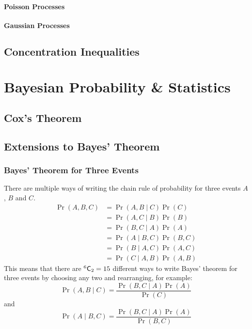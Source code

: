 \documentclass[11pt]{report} %
\begin{document}
\subsubsection{Poisson Processes}

\subsubsection{Gaussian Processes}

\section{Concentration Inequalities}

\chapter{Bayesian Probability \& Statistics}

\section{Cox's Theorem}

\section{Extensions to Bayes' Theorem}

\subsection{Bayes' Theorem for Three Events}

There are multiple ways of writing the chain rule of probability for three events $A$, $B$ and $C$.
\begin{align}
\operatorname{Pr}\left(A, B, C\right) &= \operatorname{Pr}\left(A, B\middle|C\right)\operatorname{Pr}\left(C\right) \\
&= \operatorname{Pr}\left(A, C\middle|B\right)\operatorname{Pr}\left(B\right) \\
&= \operatorname{Pr}\left(B, C\middle|A\right)\operatorname{Pr}\left(A\right) \\
&= \operatorname{Pr}\left(A\middle|B, C\right)\operatorname{Pr}\left(B, C\right) \\
&= \operatorname{Pr}\left(B\middle|A, C\right)\operatorname{Pr}\left(A, C\right) \\
&= \operatorname{Pr}\left(C\middle|A, B\right)\operatorname{Pr}\left(A, B\right)
\end{align}
This means that there are $\mathstrut^{6}\mathsf{C}_{2} = 15$ different ways to write Bayes' theorem for three events by choosing any two and rearranging, for example:
\begin{equation}
\operatorname{Pr}\left(A, B\middle|C\right) = \dfrac{\operatorname{Pr}\left(B, C\middle|A\right)\operatorname{Pr}\left(A\right)}{\operatorname{Pr}\left(C\right)}
\end{equation}
and
\begin{equation}
\operatorname{Pr}\left(A\middle|B, C\right) = \dfrac{\operatorname{Pr}\left(B, C\middle|A\right)\operatorname{Pr}\left(A\right)}{\operatorname{Pr}\left(B, C\right)}
\end{equation}
\end{document}
